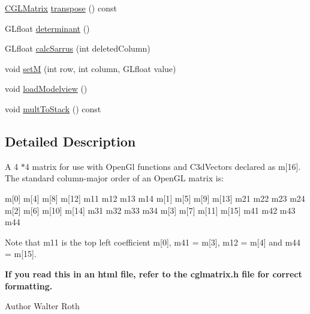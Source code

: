 \begin{DoxyCompactItemize}
\hyperlink{classCGLMatrix}{\-C\-G\-L\-Matrix} \hyperlink{classCGLMatrix_a1fdb5739b9ffb980663203a7b188e9d0}{transpose} () const 
\item 
\-G\-Lfloat \hyperlink{classCGLMatrix_ab98d99d89d5a71406d806c65ceb9d3f1}{determinant} ()
\item 
\-G\-Lfloat \hyperlink{classCGLMatrix_a2d870a98097ae6d8846a6c43e491eb0b}{calc\-Sarrus} (int deleted\-Column)
\item 
void \hyperlink{classCGLMatrix_a4fcc5626c99022aa6bc31622e500a98b}{set\-M} (int row, int column, \-G\-Lfloat value)
\item 
void \hyperlink{classCGLMatrix_aacca456a50cee1a3a7936255eb693219}{load\-Modelview} ()
\item 
void \hyperlink{classCGLMatrix_a9890f5ebe37ab67d91a9d1d8d384028e}{mult\-To\-Stack} () const 
\end{DoxyCompactItemize}


\subsection{\-Detailed \-Description}
\-A 4 $\ast$4 matrix for use with \-Open\-Gl functions and \-C3d\-Vectors declared as m\mbox{[}16\mbox{]}. \-The standard column-\/major order of an \-Open\-G\-L matrix is\-:

m\mbox{[}0\mbox{]} m\mbox{[}4\mbox{]} m\mbox{[}8\mbox{]} m\mbox{[}12\mbox{]} m11 m12 m13 m14 m\mbox{[}1\mbox{]} m\mbox{[}5\mbox{]} m\mbox{[}9\mbox{]} m\mbox{[}13\mbox{]} m21 m22 m23 m24 m\mbox{[}2\mbox{]} m\mbox{[}6\mbox{]} m\mbox{[}10\mbox{]} m\mbox{[}14\mbox{]} m31 m32 m33 m34 m\mbox{[}3\mbox{]} m\mbox{[}7\mbox{]} m\mbox{[}11\mbox{]} m\mbox{[}15\mbox{]} m41 m42 m43 m44

\-Note that m11 is the top left coefficient m\mbox{[}0\mbox{]}, m41 = m\mbox{[}3\mbox{]}, m12 = m\mbox{[}4\mbox{]} and m44 = m\mbox{[}15\mbox{]}. 

{\bfseries \-If you read this in an html file, refer to the cglmatrix.\-h file for correct formatting.} \begin{DoxyAuthor}{\-Author}
\-Walter \-Roth 
\end{DoxyAuthor}


